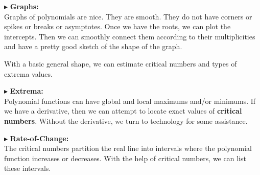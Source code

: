 \documentclass{ximera}
\begin{document}
$\blacktriangleright$ \textbf{\textcolor{red!10!blue!90!}{Graphs:}} \\ 
Graphs of polynomials are nice.  They are smooth.  They do not have corners or spikes or breaks or asymptotes. Once we have the roots, we can plot the intercepts.  Then we can smoothly connect them according to their multiplicities and have a pretty good sketch of the shape of the graph.

With a basic general shape, we can estimate critical numbers and types of extrema values.




$\blacktriangleright$  \textbf{\textcolor{red!10!blue!90!}{Extrema:}} \\ 
Polynomial functions can have global and local maximums and/or minimums. If we have a derivative, then we can attempt to locate exact values of \textbf{critical numbers}.  Without the derivative, we turn to technology for some assistance.




$\blacktriangleright$ \textbf{\textcolor{red!10!blue!90!}{Rate-of-Change:}} \\ 
The critical numbers partition the real line into intervals where the polynomial function increases or decreases.  With the help of critical numbers, we can list these intervals.
\end{document}
